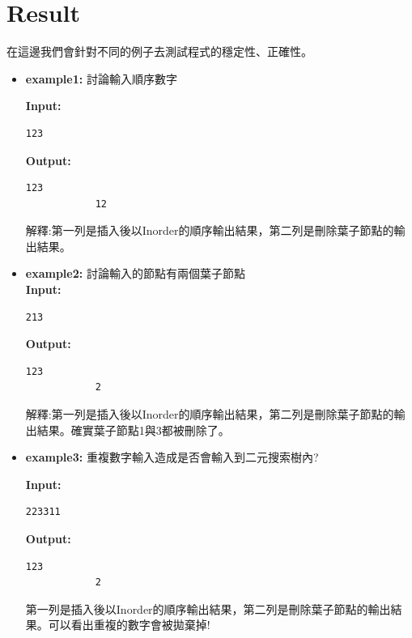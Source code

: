 \documentclass{article}
\begin{document}
	\section{Result}
	在這邊我們會針對不同的例子去測試程式的穩定性、正確性。
	\begin{itemize}
		\item \textbf{example1:} 討論輸入順序數字
		
		\textbf{Input:}
		\begin{lstlisting}[style=Cstyle]
			123
		\end{lstlisting}
		\textbf{Output:}
		\begin{lstlisting}[style=Cstyle]
			123
			12				
		\end{lstlisting}
		解釋:第一列是插入後以Inorder的順序輸出結果，第二列是刪除葉子節點的輸出結果。
		\item \textbf{example2:} 討論輸入的節點有兩個葉子節點 \\
		\textbf{Input:}
		\begin{lstlisting}[style=Cstyle]
			213		
		\end{lstlisting}
		\textbf{Output:}
		\begin{lstlisting}[style=Cstyle]
			123
			2							
		\end{lstlisting}
		解釋:第一列是插入後以Inorder的順序輸出結果，第二列是刪除葉子節點的輸出結果。確實葉子節點1與3都被刪除了。

		
		\item \textbf{example3:} 重複數字輸入造成是否會輸入到二元搜索樹內?
		
		\textbf{Input:}
		\begin{lstlisting}[style=Cstyle]
			223311
		\end{lstlisting}
		\textbf{Output:}
		\begin{lstlisting}[style=Cstyle]
			123
			2		
		\end{lstlisting}
		第一列是插入後以Inorder的順序輸出結果，第二列是刪除葉子節點的輸出結果。可以看出重複的數字會被拋棄掉!


\end{itemize}
\end{document}
